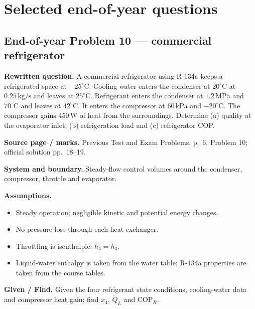 \section*{Selected end-of-year questions}

\begin{center}
\end{center}

\subsection*{End-of-year Problem 10 --- commercial refrigerator}
\textbf{Rewritten question.} A commercial refrigerator using R-134a keeps a refrigerated space at $-25^\circ\mathrm{C}$. Cooling water enters the condenser at $20^\circ\mathrm{C}$ at $0.25\,\mathrm{kg/s}$ and leaves at $25^\circ\mathrm{C}$. Refrigerant enters the condenser at $1.2\,\mathrm{MPa}$ and $70^\circ\mathrm{C}$ and leaves at $42^\circ\mathrm{C}$. It enters the compressor at $60\,\mathrm{kPa}$ and $-20^\circ\mathrm{C}$. The compressor gains $450\,\mathrm{W}$ of heat from the surroundings. Determine (a) quality at the evaporator inlet, (b) refrigeration load and (c) refrigerator COP.

\textbf{Source page / marks.} Previous Test and Exam Problems, p.~6, Problem 10; official solution pp.~18--19.

\textbf{System and boundary.} Steady-flow control volumes around the condenser, compressor, throttle and evaporator.

\textbf{Assumptions.}
\begin{itemize}
  \item Steady operation; negligible kinetic and potential energy changes.
  \item No pressure loss through each heat exchanger.
  \item Throttling is isenthalpic: $h_4=h_3$.
  \item Liquid-water enthalpy is taken from the water table; R-134a properties are taken from the course tables.
\end{itemize}

\textbf{Given / Find.} Given the four refrigerant state conditions, cooling-water data and compressor heat gain; find $x_4$, $\dot Q_L$ and $\mathrm{COP}_R$.

